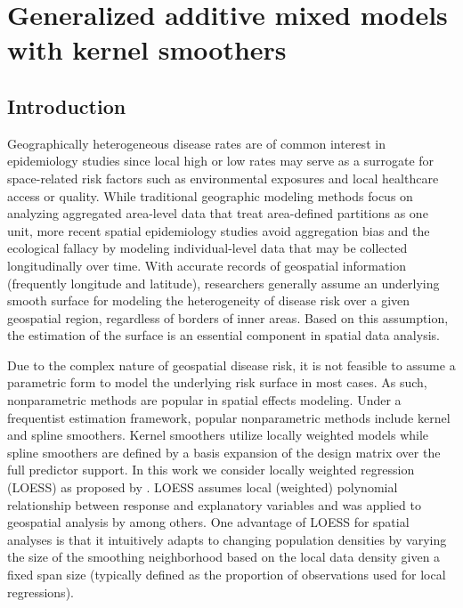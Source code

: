 \chapter{Generalized additive mixed models with kernel smoothers}
	
	\section{Introduction}
	\label{s:intro}
	Geographically heterogeneous disease rates are of common interest in epidemiology studies since local high or low rates may serve as a surrogate for space-related risk factors such as environmental exposures and local healthcare access or quality. While traditional geographic modeling methods focus on analyzing aggregated area-level data that treat area-defined partitions as one unit, more recent spatial epidemiology studies avoid aggregation bias and the ecological fallacy by modeling individual-level data that may be collected longitudinally over time.  With accurate records of geospatial information (frequently longitude and latitude), researchers generally assume an underlying smooth surface for modeling the heterogeneity of disease risk over a given geospatial region, regardless of borders of inner areas. Based on this assumption, the estimation of the surface is an essential component in spatial data analysis. 
	
	Due to the complex nature of geospatial disease risk, it is not feasible to assume a parametric form to model the underlying risk surface in most cases. As such, nonparametric methods are popular in spatial effects modeling. Under a frequentist estimation framework, popular nonparametric methods include kernel and spline smoothers. Kernel smoothers utilize locally weighted models while spline smoothers are defined by a basis expansion of the design matrix over the full predictor support. In this work we consider locally weighted regression (LOESS) as proposed by \citet{cleveland1979robust}. LOESS assumes local (weighted) polynomial relationship between response and explanatory variables and was applied to geospatial analysis by \citet{brunsdon1996geographically} among others. One advantage of LOESS for spatial analyses is that it intuitively adapts to changing population densities by varying the size of the smoothing neighborhood based on the local data density given a fixed span size (typically defined as the proportion of observations used for local regressions). %
	
